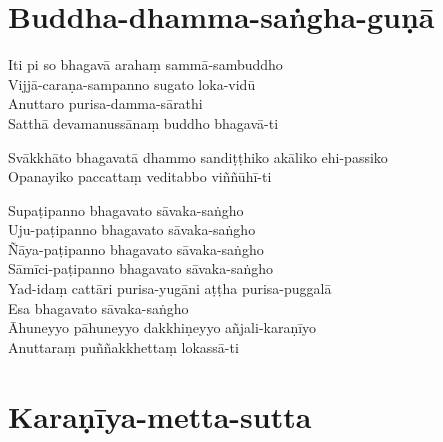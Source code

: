 \chapter{Buddha-dhamma-saṅgha-guṇā}%


\enlargethispage{\baselineskip}

\begin{paritta}
Iti pi so bhagavā arahaṃ sammā-sambuddho\\
Vijjā-caraṇa-sampanno sugato loka-vidū\\
Anuttaro purisa-damma-sārathi\\
Satthā devamanussānaṃ buddho bhagavā-ti

Svākkhāto bhagavatā dhammo sandiṭṭhiko akāliko ehi-passiko\\
Opanayiko paccattaṃ veditabbo viññūhī-ti

Supaṭipanno bhagavato sāvaka-saṅgho\\
Uju-paṭipanno bhagavato sāvaka-saṅgho\\
Ñāya-paṭipanno bhagavato sāvaka-saṅgho\\
Sāmīci-paṭipanno bhagavato sāvaka-saṅgho\\
Yad-idaṃ cattāri purisa-yugāni aṭṭha purisa-puggalā\\
Esa bhagavato sāvaka-saṅgho\\
Āhuneyyo pāhuneyyo dakkhiṇeyyo añjali-karaṇīyo\\
Anuttaraṃ puññakkhettaṃ lokassā-ti
\end{paritta}

\clearpage

\chapter{Karaṇīya-metta-sutta}%



